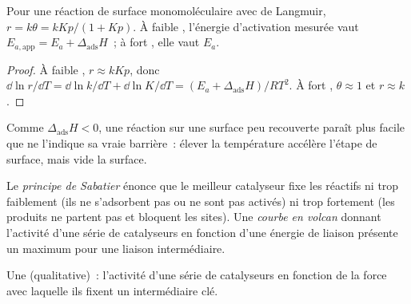 \begin{proposition}\label{prop:b3:surfaces-catalysis:apparent-ea}
Pour une réaction de surface monomoléculaire avec  de Langmuir,
$r = k\theta = kKp/(1 + Kp)$.
À faible , l'énergie d'activation mesurée vaut
$E_{a,\mathrm{app}} = E_a + \Delta_{\mathrm{ads}}H$~; à fort , elle vaut $E_a$.
\end{proposition}

\begin{proof}
À faible , $r \approx kKp$, donc $\dd\ln r/\dd T = \dd\ln k/\dd T + \dd\ln K/\dd T = (E_a + \Delta_{\mathrm{ads}}H)/RT^2$.
À fort , $\theta \approx 1$ et $r \approx k$.
\end{proof}

Comme $\Delta_{\mathrm{ads}}H < 0$, une réaction sur une surface peu
recouverte paraît plus facile que ne l'indique sa vraie barrière~:
élever la température accélère l'étape de surface, mais vide la
surface.

\begin{definition}\label{def:b3:surfaces-catalysis:sabatier}
Le \emph{principe de Sabatier} énonce que le
meilleur catalyseur fixe les réactifs ni trop faiblement (ils ne
s'adsorbent pas ou ne sont pas activés) ni trop fortement (les produits
ne partent pas et bloquent les sites). Une
\emph{courbe en volcan} donnant l'activité d'une
série de catalyseurs en fonction d'une énergie de liaison présente un
maximum pour une liaison intermédiaire.
\end{definition}

\begin{omfigure}

{\small Une  (qualitative)~: l'activité d'une série de
catalyseurs en fonction de la force avec laquelle ils fixent un
intermédiaire clé.}
\end{omfigure}


